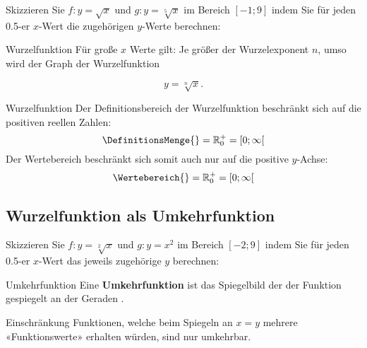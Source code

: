 Skizzieren Sie $f: y = \sqrt{x}$ und $g: y=\sqrt[5]{x}$ im Bereich $[-1; 9]$ indem Sie für jeden 0.5-er $x$-Wert die zugehörigen $y$-Werte berechnen:


\begin{bemerkung}{Wurzelfunktion}{}
Für große $x$ Werte gilt: Je größer der Wurzelexponent $n$, umso
 wird der Graph der Wurzelfunktion

$$y=\sqrt[n]{x}.$$ 

\end{bemerkung}


\begin{definition}{Wurzelfunktion}{}
  Der Definitionsbereich der Wurzelfunktion beschränkt sich auf die
  positiven reellen Zahlen:
  $$\DefinitionsMenge{} = \mathbb{R}_0^{+} = [0;\infty[$$
      Der Wertebereich beschränkt sich somit auch nur auf die positive $y$-Achse:
  $$\Wertebereich{} = \mathbb{R}_0^{+} = [0;\infty[$$
      
\end{definition}
\newpage

\subsection{Wurzelfunktion als Umkehrfunktion}

Skizzieren Sie $f: y = \sqrt[2]{x}$ und $g: y=x^2$ im Bereich $[-2; 9]$ indem Sie für jeden 0.5-er $x$-Wert das jeweils zugehörige $y$ berechnen:


\begin{bemerkung}{Umkehrfunktion}{}
  Eine \textbf{Umkehrfunktion} ist das Spiegelbild der der Funktion
  gespiegelt an der Geraden .
\end{bemerkung}  

\begin{bemerkung}{Einschränkung}{}
Funktionen, welche beim Spiegeln an $x=y$ mehrere «Funktionswerte»
erhalten würden, sind nur  umkehrbar.
\end{bemerkung}

